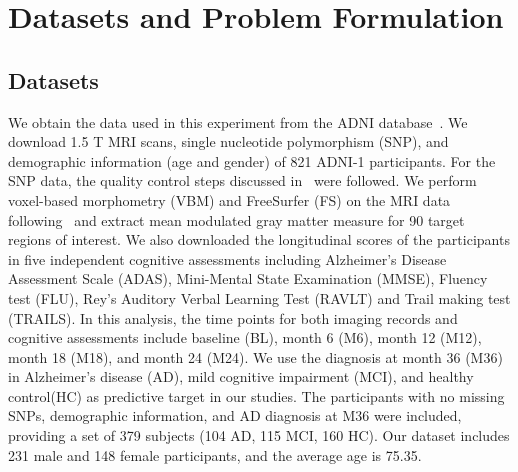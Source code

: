 \section{Datasets and Problem Formulation}
\subsection{Datasets}
We obtain the data used in this experiment from the ADNI database~\cite{risacher2010longitudinal}. We download 1.5 T MRI scans, single nucleotide polymorphism (SNP), and demographic information (age and gender) of 821 ADNI-1 participants. For the SNP data, the quality control steps discussed in~\cite{shen2010whole} were followed. We perform voxel-based morphometry (VBM) and FreeSurfer (FS) on the MRI data following~\cite{risacher2010longitudinal} and extract mean modulated gray matter measure for 90 target regions of interest. We also downloaded the longitudinal scores of the participants in five independent cognitive assessments including Alzheimer’s Disease Assessment Scale (ADAS), Mini-Mental State Examination (MMSE), Fluency test (FLU), Rey’s Auditory Verbal Learning Test (RAVLT) and Trail making test (TRAILS). 
In this analysis, the time points for both imaging records and cognitive assessments include baseline (BL), month 6 (M6), month 12 (M12), month 18 (M18), and month 24 (M24). We use the diagnosis at month 36 (M36) in Alzheimer's disease (AD), mild cognitive impairment (MCI), and healthy control(HC) as predictive target in our studies. The participants with no missing SNPs, demographic information, and AD diagnosis at M36 were included, providing a set of 379 subjects (104 AD, 115 MCI, 160 HC). Our dataset includes 231 male and 148 female participants, and the average age is 75.35.

